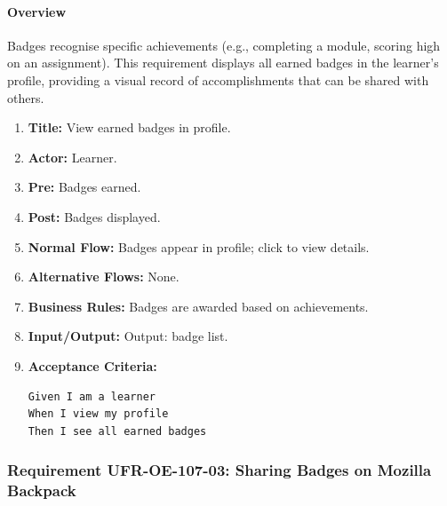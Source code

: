 \paragraph{Overview}
Badges recognise specific achievements (e.g., completing a module, scoring high on an assignment). This requirement displays all earned badges in the learner’s profile, providing a visual record of accomplishments that can be shared with others.
\begin{enumerate}[label=\textbf{\arabic*.}]
\item \textbf{Title:} View earned badges in profile.
\item \textbf{Actor:} Learner.
\item \textbf{Pre:} Badges earned.
\item \textbf{Post:} Badges displayed.
\item \textbf{Normal Flow:} Badges appear in profile; click to view details.
\item \textbf{Alternative Flows:} None.
\item \textbf{Business Rules:} Badges are awarded based on achievements.
\item \textbf{Input/Output:} Output: badge list.
\item \textbf{Acceptance Criteria:}
    \begin{verbatim}
Given I am a learner
When I view my profile
Then I see all earned badges
    \end{verbatim}
\end{enumerate}

\subsubsection{Requirement UFR-OE-107-03: Sharing Badges on Mozilla Backpack}
